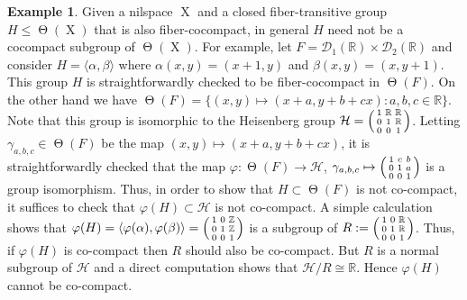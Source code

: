 \documentclass[a4paper,12pt,reqno]{amsart}
\theoremstyle{definition}
\newtheorem{example}[theorem]{Example}
\def\to{\rightarrow}
\newcommand{\mc}{\mathcal}
\newcommand{\mb}{\mathbb}
\DeclareMathOperator{\tran}{\Theta}
\DeclareMathOperator{\ns}{X}
\begin{document}
\begin{example}\label{ex:fiber-co-comp-not-co-comp}
Given a nilspace $\ns$ and a closed fiber-transitive group $H\leq \tran(\ns)$ that is also fiber-cocompact, in general $H$ need not be a cocompact subgroup of $\tran(\ns)$. For example, let $F=\mc{D}_1(\mb{R})\times \mc{D}_2(\mb{R})$ and consider $H=\langle \alpha,\beta \rangle$ where $\alpha(x,y)=(x+1,y)$ and $\beta(x,y)=(x,y+1)$. This group $H$ is straightforwardly checked to be fiber-cocompact in $\tran(F)$. On the other hand we have $\tran(F)=\{(x,y)\mapsto(x+a,y+b+cx):a,b,c\in \mb{R}\}$. Note that this group is isomorphic to the Heisenberg group $\mc{H}= \begin{psmallmatrix} 1 & \mb{R} & \mb{R}\\[0.1em]0  & 1 & \mb{R}\\[0.1em] 0 & 0 & 1 \end{psmallmatrix}$. Letting $\gamma_{a,b,c}\in \tran(F)$ be the map $(x,y)\mapsto (x+a,y+b+cx)$,  it is straightforwardly checked that the map $\varphi:\tran(F)\to \mc{H}$, $\gamma_{a,b,c}\mapsto \begin{psmallmatrix} 1 & c & b\\[0.1em]0  & 1 & a\\[0.1em] 0 & 0 & 1 \end{psmallmatrix}$ is a group isomorphism. Thus, in order to show that $H\subset \tran(F)$ is not co-compact, it suffices to check that $\varphi(H)\subset \mc{H}$ is not co-compact. A simple calculation shows that $\varphi(H)=\langle \varphi(\alpha),\varphi(\beta) \rangle=\begin{psmallmatrix} 1 & 0 & \mb{Z}\\[0.1em]0  & 1 & \mb{Z}\\[0.1em] 0 & 0 & 1 \end{psmallmatrix}$ is a subgroup of $R:= \begin{psmallmatrix} 1 & 0 & \mb{R}\\[0.1em]0  & 1 & \mb{R}\\[0.1em] 0 & 0 & 1 \end{psmallmatrix}$. Thus, if $\varphi(H)$ is co-compact then  $R$ should also be co-compact. But $R$ is a normal subgroup of $\mc{H}$ and a direct computation shows that $\mc{H}/R\cong \mb{R}$. Hence $\varphi(H)$ cannot be co-compact.
\end{example}
\end{document}
